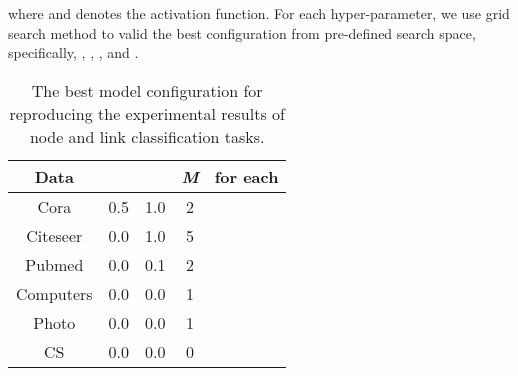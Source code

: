 \documentclass[preprint]{article}
\begin{document}
where  and  denotes the activation function. For each hyper-parameter, we use grid search method to valid the best configuration from pre-defined search space, specifically, , , , and .

\begin{table}[htp]
\caption{The best model configuration for reproducing the experimental results of node and link classification tasks.}
\label{stat}
\centering
\begin{tabular}{c c c c c}
\toprule
	\textbf{Data} &  &  & \emph{M} &  for each \\
\midrule
	Cora &  0.5 & 1.0  & 2 & \\
	Citeseer & 0.0 & 1.0 & 5 & \\
	Pubmed & 0.0 & 0.1 & 2 & \\
	Computers & 0.0 & 0.0 & 1 &  \\
	Photo & 0.0 & 0.0 & 1 &  \\
	CS & 0.0 & 0.0 & 0 & \\
\bottomrule
\end{tabular}
\end{table}
\end{document}
